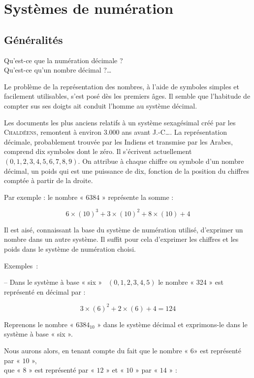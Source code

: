 \ifdefined\COMPLETE
\else
    
    
\fi
\chapter{Systèmes de numération}

\section{Généralités}

Qu'est-ce que la numération décimale ? \\
Qu'est-ce qu'un nombre décimal ?\ldots 

Le problème de la représentation des nombres, à l'aide de symboles simples et facilement utilisables, s'est posé dès les premiers âges. Il semble que l'habitude de compter sus ses doigts ait conduit l'homme au système décimal. 

Les documents les plus anciens relatifs à un système sexagésimal créé par les \textsc{Chaldéens}, remontent à environ 3.000 ans avant \textsc{J.-C}\ldots. La représentation décimale, probablement trouvée par les Indiens et transmise par les Arabes, comprend dix symboles dont le zéro. Il s'écrivent actuellement $(0, 1, 2, 3, 4, 5, 6, 7, 8, 9)$. On attribue à chaque chiffre ou symbole d'un nombre décimal, un poids qui est une puissance de dix, fonction de la position du chiffres comptée à partir de la droite. 

Par exemple : le nombre « $6384$ » représente la somme :

\[ 6 \times (10)^3 + 3 \times (10)^2 + 8 \times (10) + 4 \] 

Il est aisé, connaissant la base du système de numération utilisé,
d'exprimer un nombre dans un autre système. Il suffit pour cela d'exprimer
les chiffres et les poids dans le système de numération choisi.

Exemples~:

-- Dans le système à base « six » ~$(0,1,2,3,4,5)$ le nombre « 324 » est
représenté en décimal par :

\[ 3\times(6)^{2}+2\times(6)+4=124 \]

Reprenons le nombre « $6384_{10}$ » dans le système décimal et exprimons-le dans le système à base « six ». 

Nous aurons alors, en tenant compte du fait que le nombre « $6$» est représenté par « $10$ », \\
que « $8$ » est représenté par « $12$ » et « $10$ » par « $14$ » :

